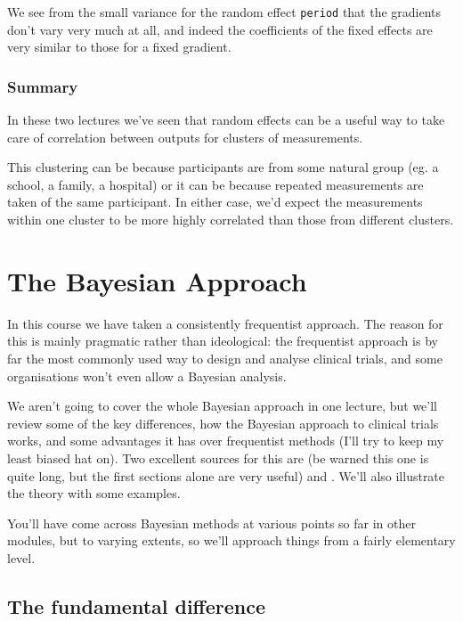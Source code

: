 \documentclass[
  openany]{book}
\theoremstyle{definition}
\theoremstyle{definition}
\theoremstyle{definition}
\theoremstyle{definition}
\theoremstyle{remark}
\begin{document}
We see from the small variance for the random effect \texttt{period} that the gradients don't vary very much at all, and indeed the coefficients of the fixed effects are very similar to those for a fixed gradient.

\subsection*{Summary}\label{summary}

In these two lectures we've seen that random effects can be a useful way to take care of correlation between outputs for clusters of measurements.

This clustering can be because participants are from some natural group (eg. a school, a family, a hospital) or it can be because repeated measurements are taken of the same participant. In either case, we'd expect the measurements within one cluster to be more highly correlated than those from different clusters.

\chapter{The Bayesian Approach}\label{the-bayesian-approach}

In this course we have taken a consistently frequentist approach. The reason for this is mainly pragmatic rather than ideological: the frequentist approach is by far the most commonly used way to design and analyse clinical trials, and some organisations won't even allow a Bayesian analysis.

We aren't going to cover the whole Bayesian approach in one lecture, but we'll review some of the key differences, how the Bayesian approach to clinical trials works, and some advantages it has over frequentist methods (I'll try to keep my least biased hat on). Two excellent sources for this are \citet{spiegelhalter1994bayesian} (be warned this one is quite long, but the first sections alone are very useful) and \citet{berry2006bayesian}. We'll also illustrate the theory with some examples.

You'll have come across Bayesian methods at various points so far in other modules, but to varying extents, so we'll approach things from a fairly elementary level.

\section{The fundamental difference}\label{the-fundamental-difference}
\end{document}
